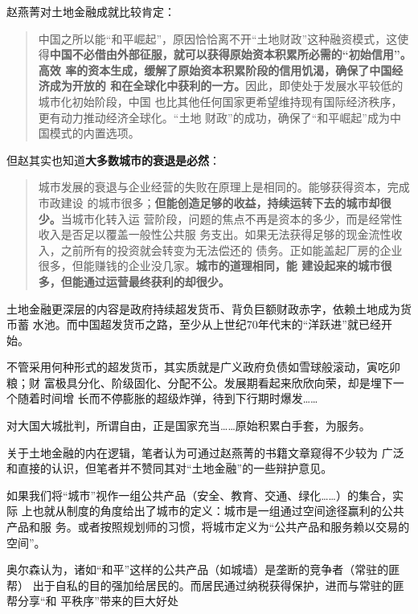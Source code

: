 赵燕菁对土地金融成就比较肯定：
\begin{quotation}
  中国之所以能“和平崛起”，原因恰恰离不开“土地财政”这种融资模式，这使
  得\textbf{中国不必借由外部征服，就可以获得原始资本积累所必需的“初始信用”。高效
    率的资本生成，缓解了原始资本积累阶段的信用饥渴，确保了中国经济成为开放的
    和在全球化中获利的一方。}因此，即使处于发展水平较低的城市化初始阶段，中国
  也比其他任何国家更希望维持现有国际经济秩序，更有动力推动经济全球化。“土地
  财政”的成功，确保了“和平崛起”成为中国模式的内置选项。
\end{quotation}

但赵其实也知道\textbf{大多数城市的衰退是必然}：
\begin{quotation}
  城市发展的衰退与企业经营的失败在原理上是相同的。能够获得资本，完成市政建设
  的城市很多；\textbf{但能创造足够的收益，持续运转下去的城市却很少。}当城市化转入运
  营阶段，问题的焦点不再是资本的多少，而是经常性收入是否足以覆盖一般性公共服
  务支出。如果无法获得足够的现金流性收入，之前所有的投资就会转变为无法偿还的
  债务。正如能盖起厂房的企业很多，但能赚钱的企业没几家。\textbf{城市的道理相同，能
    建设起来的城市很多，但能通过运营最终获利的却很少。}
\end{quotation}

土地金融更深层的内容是政府持续超发货币、背负巨额财政赤字，依赖土地成为货币蓄
水池。而中国超发货币之路，至少从上世纪70年代末的“洋跃进”就已经开始。

不管采用何种形式的超发货币，其实质就是广义政府负债如雪球般滚动，寅吃卯粮；财
富极具分化、阶级固化、分配不公。发展期看起来欣欣向荣，却是埋下一个随着时间增
长而不停膨胀的超级炸弹，待到下行期时爆发……



对大国大城批判，所谓自由，正是国家充当……原始积累白手套，为服务。



关于土地金融的内在逻辑，笔者认为可通过赵燕菁的书籍文章\cite{dajueqi}窥得不少较为
广泛和直接的认识，但笔者并不赞同其对“土地金融”的一些辩护意见。




如果我们将“城市”视作一组公共产品（安全、教育、交通、绿化……）的集合，实际
上也就从制度的角度给出了城市的定义：城市是一组通过空间途径赢利的公共产品和服
务。或者按照规划师的习惯，将城市定义为“公共产品和服务赖以交易的空间”。

奥尔森认为，诸如“和平”这样的公共产品（如城墙）是垄断的竞争者（常驻的匪帮）
出于自私的目的强加给居民的。而居民通过纳税获得保护，进而与常驻的匪帮分享“和
平秩序”带来的巨大好处


